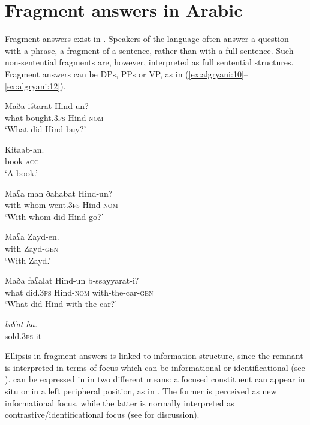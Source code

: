 \documentclass[output=paper]{LSP/langsci}
\begin{document}
\section{Fragment answers in Arabic}\label{sec:algryani:2}


Fragment answers exist in . Speakers of the language often answer a question with a phrase, a fragment of a sentence, rather than with a full sentence. Such non-sentential fragments are, however, interpreted as full sentential structures. Fragment answers can be DPs, PPs or VP, as in (\ref{ex:algryani:10}--\ref{ex:algryani:12}).


\ea%
 \label{ex:algryani:10}
\begin{xlist}[A:]
\gll Maða ištarat Hind-un?\\
 what bought.\textsc{3fs} Hind-\textsc{nom}\\
\glt  ‘What did Hind buy?’

\gll Kitaab-an.\\
 book-\textsc{acc}\\
\glt  \textsc{‘A} book.’
\end{xlist}
\z


\ea%
 \label{ex:algryani:11}
\begin{xlist}[A:]
\gll Maʕa man ðahabat Hind-un?\\
     with whom went.\textsc{3fs} Hind-\textsc{nom}\\
\glt  ‘With whom did Hind go?’

\gll  Maʕa Zayd-en.\\
 with Zayd-\textsc{gen}\\
\glt  ‘With Zayd.’
\end{xlist}
\z


\ea%
 \label{ex:algryani:12}
\begin{xlist}[A:]
 \gll Maða faʕalat Hind-un b-ssayyarat-i?\\
     what did.\textsc{3fs} Hind-\textsc{nom} with-the-car-\textsc{gen}\\
\glt ‘What did Hind with the car?’

\gll \textit{baʕat-ha.} \\
 sold.\textsc{3fs}{}-it\\
 \end{xlist}
 \z

Ellipsis in fragment answers is linked to information structure, since the remnant is interpreted in terms of focus which can be informational or identificational (see \citealt{Brunetti2003,Busquets2006,Kolokonte2008}).  can be expressed in  in two different means: a focused constituent can appear in situ or in a left peripheral position, as in . The former is perceived as new informational focus, while the latter is normally interpreted as contrastive/identificational focus (see \citealt{Moutaouakil1989,AounEtAl2010} for discussion).
\end{document}
